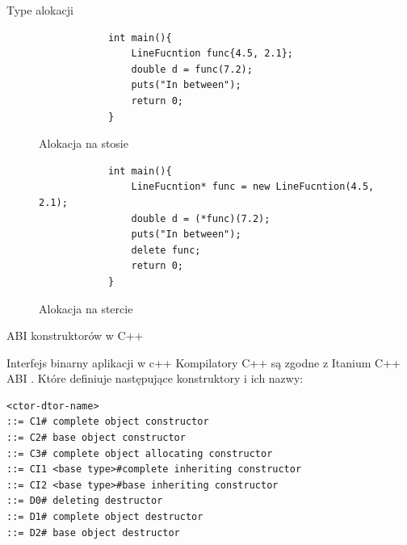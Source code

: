 \documentclass[xcolor=table]{beamer}
\begin{document}
\begin{frame}[containsverbatim]{Type alokacji}
    \begin{figure}
        \centering
        \tiny
    \begin{verbatim}
            int main(){
                LineFucntion func{4.5, 2.1};
                double d = func(7.2);
                puts("In between");
                return 0;
            }
    \end{verbatim}
        \label{fig:cpp-stack-allocation}
        \caption{Alokacja na stosie}
    \end{figure}
    
    \begin{figure}
        \centering
        \tiny
    \begin{verbatim}
            int main(){
                LineFucntion* func = new LineFucntion(4.5, 2.1);
                double d = (*func)(7.2);
                puts("In between");
                delete func;
                return 0;
            }
    \end{verbatim}
        \label{fig:cpp-heap-allocation}
        \caption{Alokacja na stercie}
    \end{figure}
\end{frame}


\begin{frame}[containsverbatim]{ABI konstruktorów w C++ }

\begin{block}{Interfejs binarny aplikacji w c++}
    Kompilatory C++ są zgodne z Itanium C++ ABI \cite{itanium-abi}.
    Które definiuje następujące konstruktory i ich nazwy:

\begin{verbatim}
<ctor-dtor-name>
::= C1# complete object constructor 
::= C2# base object constructor 
::= C3# complete object allocating constructor 
::= CI1 <base type>#complete inheriting constructor
::= CI2 <base type>#base inheriting constructor
::= D0# deleting destructor
::= D1# complete object destructor
::= D2# base object destructor
 \end{verbatim}
\end{block}
\end{frame}
\end{document}
